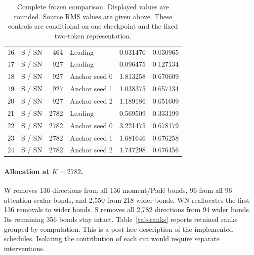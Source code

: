 \documentclass{article}
\begin{document}
\begin{table}[ht]
\begin{tabular}{@{}rlrlrr@{}}
16 & S / SN & 464 & Leading & 0.031470 & 0.030965\\
17 & S / SN & 927 & Leading & 0.096475 & 0.127134\\
18 & S / SN & 927 & Anchor seed 0 & 1.813258 & 0.670609\\
19 & S / SN & 927 & Anchor seed 1 & 1.038375 & 0.657134\\
20 & S / SN & 927 & Anchor seed 2 & 1.189186 & 0.651609\\
21 & S / SN & 2782 & Leading & 0.569509 & 0.333199\\
22 & S / SN & 2782 & Anchor seed 0 & 3.221475 & 0.678179\\
23 & S / SN & 2782 & Anchor seed 1 & 1.681646 & 0.676258\\
24 & S / SN & 2782 & Anchor seed 2 & 1.747298 & 0.676456\\
\bottomrule
\end{tabular}
\caption{Complete frozen comparison. Displayed values are rounded. Source RMS values are given above. These controls are conditional on one checkpoint and the fixed two-token representation.}
\label{tab.complete}
\end{table}


\clearpage
\paragraph{Allocation at $K=2782$.}
W removes 136 directions from all 136 moment/Pad\'e bonds, 96 from all 96 attention-scalar bonds, and 2,550 from 218 wider bonds. WN reallocates the first 136 removals to wider bonds. S removes all 2,782 directions from 94 wider bonds. Its remaining 356 bonds stay intact. Table~\ref{tab.ranks} reports retained ranks grouped by computation. This is a post hoc description of the implemented schedules. Isolating the contribution of each cut would require separate interventions.
\end{document}
